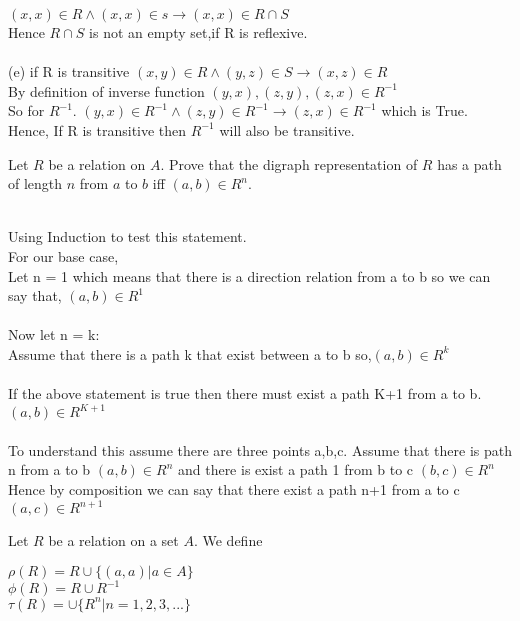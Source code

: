 \documentclass[addpoints]{exam}
\begin{document}
\begin{questions}
\begin{solution}
    ${(x,x) \in R} \wedge {(x,x) \in s} \rightarrow {(x,x) \in R \cap S}$\\
    Hence $R \cap S$ is not an empty set,if R is reflexive.\\
    \\
    (e) if R is transitive ${(x,y) \in R} \wedge {(y,z) \in S} \rightarrow {(x,z) \in R}$\\
    By definition of inverse function ${(y,x),(z,y),(z,x) \in R^{-1}}$\\
    So for ${R^{-1}}$. ${(y,x) \in R^{-1} \wedge (z,y) \in R^{-1} \rightarrow (z,x) \in R^{-1}}$ which is True. Hence, If R is transitive then $R^{-1}$ will also be transitive.
    
    \end{solution}
  
\question Let $R$ be a relation on $A$. Prove that the digraph representation of $R$ has a path of length $n$ from $a$ to $b$ iff $(a, b) \in R^n$.

  \begin{solution}\\
    Using Induction to test this statement.\\
    For our base case,\\
    Let n = 1 which means that there is a direction relation from a to b so we can say that, $(a, b) \in R^1$\\
    \\
    Now let n = k:\\
    Assume that there is a path k that exist between a to b so,$(a, b) \in R^k$\\
    \\
    If the above statement is true then there must exist a path K+1 from a to b. $(a, b) \in R^{K+1}$\\
    \\
    To understand this assume there are three points a,b,c. Assume that there is path n from a to b $(a, b) \in R^n$ and there is exist a path 1 from b to c $( b,c) \in R^n$\\
    Hence by composition we can say that there exist a path n+1 from a to c $(a,c) \in R^{n+1}$
    
  \end{solution}

\question
    Let $R$ be a relation on a set $A$. We define

    $\rho (R) = R \cup \{(a, a) | a \in A\}$ \\ 
    $\phi (R) = R \cup R^{-1}$ \\
    $\tau (R) = \cup \{ R^n | n = 1,2,3,...\}$
    

\end{questions}
\end{document}
